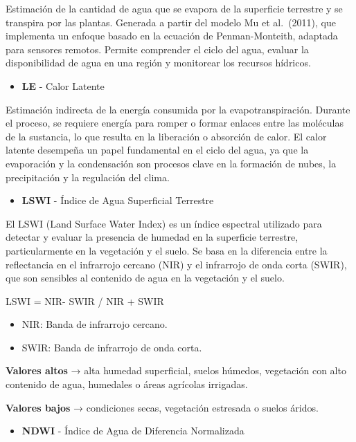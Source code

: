 \documentclass[
]{book}
\providecommand{\tightlist}{%
  \setlength{\itemsep}{0pt}\setlength{\parskip}{0pt}}
\begin{document}
Estimación de la cantidad de agua que se evapora de la superficie terrestre y se transpira por las plantas. Generada a partir del modelo Mu et al.~(2011), que implementa un enfoque basado en la ecuación de Penman-Monteith, adaptada para sensores remotos. Permite comprender el ciclo del agua, evaluar la disponibilidad de agua en una región y monitorear los recursos hídricos.

\begin{itemize}
\tightlist
\item
  \textbf{LE} - Calor Latente
\end{itemize}

Estimación indirecta de la energía consumida por la evapotranspiración. Durante el proceso, se requiere energía para romper o formar enlaces entre las moléculas de la sustancia, lo que resulta en la liberación o absorción de calor. El calor latente desempeña un papel fundamental en el ciclo del agua, ya que la evaporación y la condensación son procesos clave en la formación de nubes, la precipitación y la regulación del clima.

\begin{itemize}
\tightlist
\item
  \textbf{LSWI} - Índice de Agua Superficial Terrestre
\end{itemize}

El LSWI (Land Surface Water Index) es un índice espectral utilizado para detectar y evaluar la presencia de humedad en la superficie terrestre, particularmente en la vegetación y el suelo. Se basa en la diferencia entre la reflectancia en el infrarrojo cercano (NIR) y el infrarrojo de onda corta (SWIR), que son sensibles al contenido de agua en la vegetación y el suelo.

LSWI = NIR- SWIR / NIR + SWIR\hspace{0pt}

\begin{itemize}
\item
  NIR: Banda de infrarrojo cercano.
\item
  SWIR: Banda de infrarrojo de onda corta.
\end{itemize}

\textbf{Valores altos} → alta humedad superficial, suelos húmedos, vegetación con alto contenido de agua, humedales o áreas agrícolas irrigadas.

\textbf{Valores bajos} → condiciones secas, vegetación estresada o suelos áridos.

\begin{itemize}
\tightlist
\item
  \textbf{NDWI} - Índice de Agua de Diferencia Normalizada
\end{itemize}
\end{document}
